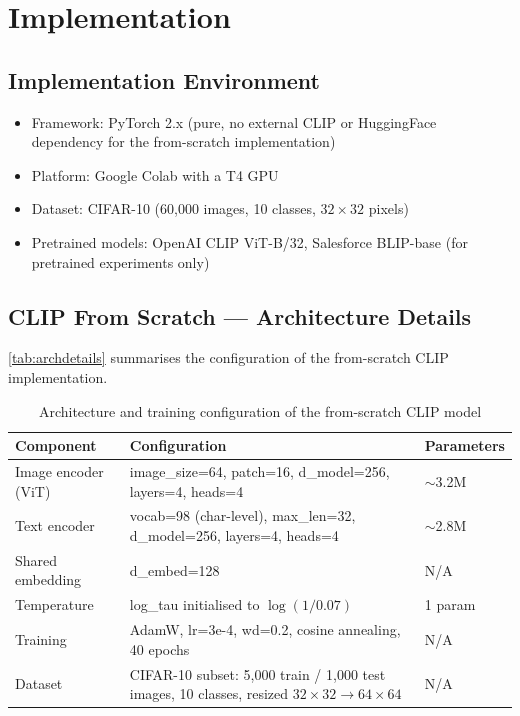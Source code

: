 \documentclass{iutbscthesis}
\begin{document}
\chapter{Implementation}

\section{Implementation Environment}

\begin{itemize}
    \item Framework: PyTorch 2.x (pure, no external CLIP or HuggingFace dependency for the from-scratch implementation)
    \item Platform: Google Colab with a T4 GPU
    \item Dataset: CIFAR-10 (60{,}000 images, 10 classes, $32 \times 32$ pixels)
    \item Pretrained models: OpenAI CLIP ViT-B/32, Salesforce BLIP-base (for pretrained experiments only)
\end{itemize}

\section{CLIP From Scratch --- Architecture Details}

\autoref{tab:archdetails} summarises the configuration of the from-scratch CLIP implementation.

\begin{table}[H]
    \centering
    \begin{tabular}{l l l}
        \toprule
        \textbf{Component} & \textbf{Configuration} & \textbf{Parameters} \\
        \midrule
        Image encoder (ViT) & image\_size=64, patch=16, d\_model=256, layers=4, heads=4 & $\sim$3.2M \\
        Text encoder & vocab=98 (char-level), max\_len=32, d\_model=256, layers=4, heads=4 & $\sim$2.8M \\
        Shared embedding & d\_embed=128 & N/A \\
        Temperature & log\_tau initialised to $\log(1/0.07)$ & 1 param \\
        Training & AdamW, lr=3e-4, wd=0.2, cosine annealing, 40 epochs & N/A \\
        Dataset & CIFAR-10 subset: 5{,}000 train / 1{,}000 test images, 10 classes, resized $32\times32 \to 64\times64$ & N/A \\
        \bottomrule
    \end{tabular}
    \caption{Architecture and training configuration of the from-scratch CLIP model}
    \label{tab:archdetails}
\end{table}
\end{document}
